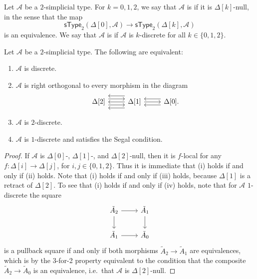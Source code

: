 \begin{defn}
Let $\mathcal{A}$ be a $2$-simplicial type. For $k=0,1,2$, we say that $\mathcal{A}$ is  if it is $\Delta[k]$-null, in the sense that the map
\begin{equation*}
\mathsf{sType}_2(\Delta[0],\mathcal{A})\to\mathsf{sType}_2(\Delta[k],\mathcal{A})
\end{equation*}
is an equivalence. We say that $\mathcal{A}$ is  if $\mathcal{A}$ is $k$-discrete for all $k\in\{0,1,2\}$.
\end{defn}

\begin{prp}
Let $\mathcal{A}$ be a $2$-simplicial type. The following are equivalent:
\begin{enumerate}
\item $\mathcal{A}$ is discrete.
\item $\mathcal{A}$ is right orthogonal to every morphism in the diagram
\begin{equation*}
\begin{tikzcd}
\Delta[2] \arrow[r,yshift=1ex] \arrow[r,yshift=-1ex] & \Delta[1] \arrow[l,yshift=2ex] \arrow[l] \arrow[l,yshift=-2ex] \arrow[r] & \Delta[0]. \arrow[l,yshift=1ex] \arrow[l,yshift=-1ex]
\end{tikzcd}
\end{equation*}
\item $\mathcal{A}$ is $2$-discrete.
\item $\mathcal{A}$ is $1$-discrete and satisfies the Segal condition.
\end{enumerate}
\end{prp}

\begin{proof}
If $\mathcal{A}$ is $\Delta[0]$-, $\Delta[1]$-, and $\Delta[2]$-null, then it is $f$-local for any $f:\Delta[i]\to\Delta[j]$, for $i,j\in\{0,1,2\}$. Thus it is immediate that (i) holds if and only if (ii) holds. Note that (i) holds if and only if (iii) holds, because $\Delta[1]$ is a retract of $\Delta[2]$. To see that (i) holds if and only if (iv) holds, note that for $\mathcal{A}$ $1$-discrete the square
\begin{equation*}
\begin{tikzcd}
\tilde{A}_2 \arrow[r] \arrow[d] & \tilde{A}_1 \arrow[d] \\
\tilde{A}_1 \arrow[r] & \tilde{A}_0
\end{tikzcd}
\end{equation*}
is a pullback square if and only if both morphisms $\tilde{A}_2\to\tilde{A}_1$ are equivalences, which is by the 3-for-2 property equivalent to the condition that the composite $\tilde{A}_2\to \tilde{A}_0$ is an equivalence, i.e.~that $\mathcal{A}$ is $\Delta[2]$-null.
\end{proof}

